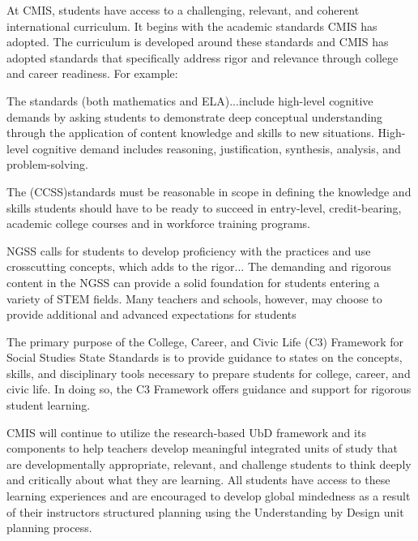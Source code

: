 \documentclass{report}
\begin{document}

\begin{findings}

At CMIS, students have access to a challenging, relevant, and coherent international curriculum. It begins with the academic  standards CMIS has adopted. The curriculum is developed around these standards and CMIS has adopted standards that specifically address rigor and relevance through college and career readiness. For example: 

The standards (both mathematics and ELA)...include high-level cognitive demands by asking students to demonstrate deep conceptual understanding through the application of content knowledge and skills to new situations. High-level cognitive demand includes reasoning, justification, synthesis, analysis, and problem-solving.

The (CCSS)standards must be reasonable in scope in defining the knowledge and skills students should have to be ready to succeed in entry-level, credit-bearing, academic college courses and in workforce training programs.

NGSS calls for students to develop proficiency with the practices and use crosscutting concepts, which adds to the rigor... The demanding and rigorous content in the NGSS can provide a solid foundation for students entering a variety of STEM fields. Many teachers and schools, however, may choose to provide additional and advanced expectations for students

The primary purpose of the College, Career, and Civic Life (C3) Framework for Social Studies State Standards is to provide guidance to states on the concepts, skills, and disciplinary tools necessary to prepare students for college, career, and civic life. In doing so, the C3 Framework offers guidance and support for rigorous student learning.


CMIS will continue to utilize the research-based UbD framework and its components to help teachers develop meaningful integrated units of study  that are developmentally appropriate, relevant, and challenge students to think deeply and critically about what they are learning. All students have access to these learning experiences and are encouraged to develop global mindedness as a result of their instructors structured planning using the Understanding by Design unit planning process. 


\end{findings}
\end{document}
